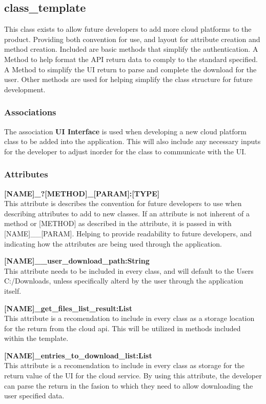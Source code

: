 \subsection{class\_template}
This class exists to allow future developers to add more cloud platforms to the product. Providing both convention for use, and layout 
for attribute creation and method creation. Included are basic methods that simplify the authentication. A Method to help format the 
API return data to comply to the standard specified. A Method to simplify the UI return to parse and complete the download for the user.
Other methods are used for helping simplify the class structure for future development. 

\subsubsection{Associations}
The association \textbf{UI Interface} is used when developing a new cloud platform class to be added into the application. This will also 
include any necessary inputs for the developer to adjust inorder for the class to communicate with the UI. 

\subsubsection{Attributes}
\textbf{[NAME]\_?[METHOD]\_[PARAM]:[TYPE]} \\
This attribute is describes the convention for future developers to use when describing attributes to add to new classes. 
If an attribute is not inherent of a method or [METHOD] as described in the attribute, it is passed in with [NAME]\_\_[PARAM].
Helping to provide readability to future developers, and indicating how the attributes are being used through the application.

\textbf{[NAME]\_\_user\_download\_path:String} \\
This attribute needs to be included in every class, and will default to the Users C:/Downloads, unless specifically alterd by the user 
through the application itself. 

\textbf{[NAME]\_get\_files\_list\_result:List} \\
This attribute is a recomendation to include in every class as a storage location for the return from the cloud api. This will be 
utilized in methods included within the template. 

\textbf{[NAME]\_entries\_to\_download\_list:List} \\
This attribute is a recomendation to include in every class as storage for the return value of the UI for the cloud service. By using
this attribute, the developer can parse the return in the fasion to which they need to allow downloading the user specified data.

